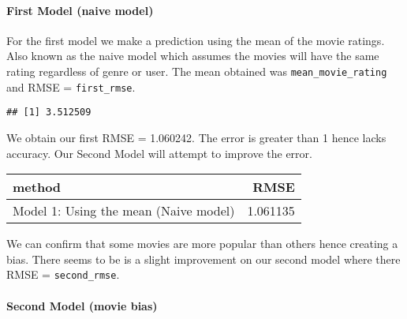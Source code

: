 \documentclass[
]{article}
\newenvironment{Shaded}{\begin{snugshade}}{\end{snugshade}}
\newcommand{\AttributeTok}[1]{\textcolor[rgb]{0.77,0.63,0.00}{#1}}
\newcommand{\CommentTok}[1]{\textcolor[rgb]{0.56,0.35,0.01}{\textit{#1}}}
\newcommand{\FunctionTok}[1]{\textcolor[rgb]{0.00,0.00,0.00}{#1}}
\newcommand{\NormalTok}[1]{#1}
\newcommand{\OtherTok}[1]{\textcolor[rgb]{0.56,0.35,0.01}{#1}}
\newcommand{\SpecialCharTok}[1]{\textcolor[rgb]{0.00,0.00,0.00}{#1}}
\newcommand{\StringTok}[1]{\textcolor[rgb]{0.31,0.60,0.02}{#1}}
\begin{document}
\hypertarget{first-model-naive-model}{%
\paragraph{First Model (naive model)}\label{first-model-naive-model}}

For the first model we make a prediction using the mean of the movie
ratings. Also known as the naive model which assumes the movies will
have the same rating regardless of genre or user. The mean obtained was
\texttt{mean\_movie\_rating} and RMSE = \texttt{first\_rmse}.

\begin{verbatim}
## [1] 3.512509
\end{verbatim}

We obtain our first RMSE = 1.060242. The error is greater than 1 hence
lacks accuracy. Our Second Model will attempt to improve the error.

\begin{Shaded}
\end{Shaded}

\begin{longtable}[]{@{}lr@{}}
\toprule
method & RMSE \\
\midrule
\endhead
Model 1: Using the mean (Naive model) & 1.061135 \\
\bottomrule
\end{longtable}

We can confirm that some movies are more popular than others hence
creating a bias. There seems to be is a slight improvement on our second
model where there RMSE = \texttt{second\_rmse}.

\hypertarget{second-model-movie-bias}{%
\paragraph{Second Model (movie bias)}\label{second-model-movie-bias}}
\end{document}
